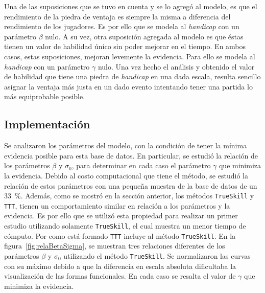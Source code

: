 \documentclass[11pt,twoside,spanish]{report} %
\begin{document}
Una de las suposiciones que se tuvo en cuenta y se lo agreg\'o al modelo, es que el rendimiento de la piedra de ventaja es siempre la misma a diferencia del rendimiento de los jugadores.
Es por ello que se modela al \textit{handicap} con un par\'ametro $\beta$ nulo.
A su vez, otra suposici\'on agregada al modelo es que \'estas tienen un valor de habilidad \'unico sin poder mejorar en el tiempo.
En ambos casos, estas suposiciones, mejoran levemente la evidencia.
Para ello se  modela al \textit{handicap} con un par\'ametro $\gamma$ nulo.
Una vez hecho el an\'alisis y obtenido el valor de habilidad que tiene una piedra de \textit{handicap} en una dada escala, resulta sencillo asignar la ventaja m\'as justa en un dado evento intentando tener una partida  lo m\'as equiprobable posible.








\subsection{Implementaci\'on}

Se analizaron los par\'ametros del modelo, con la condici\'on de tener la m\'inima evidencia posible para esta base de datos.
En particular, se estudi\'o la relaci\'on de los par\'ametros $\beta$ y $\sigma_0$, para determinar en cada caso el par\'ametro $\gamma$ que minimiza la evidencia.
Debido al costo computacional que tiene el m\'etodo, se estudi\'o la relaci\'on de estos par\'ametros con una peque\~na muestra de la base de datos de un \SI{33}{\percent}.
Adem\'as, como se mostr\'o en la secci\'on anterior, los m\'etodos \texttt{TrueSkill} y \texttt{TTT}, tienen un comportamiento similar en relaci\'on a los par\'ametros y la evidencia.
Es por ello que se utiliz\'o esta propiedad para realizar un primer estudio utilizando solamente \texttt{TrueSkill}, el cual muestra un menor tiempo de c\'omputo.
Por como est\'a formado \texttt{TTT} incluye al m\'etodo \texttt{TrueSkill}.
En la figura~\ref{fig:relaBetaSigma}, se muestran tres relaciones diferentes de los par\'ametros $\beta$ y $\sigma_0$ utilizando el m\'etodo \texttt{TrueSkill}.
Se normalizaron las curvas con su m\'aximo debido a que la diferencia en escala absoluta dificultaba la visualizaci\'on de las formas funcionales.
En cada caso se resalta el valor de $\gamma$ que minimiza la evidencia.
\end{document}
